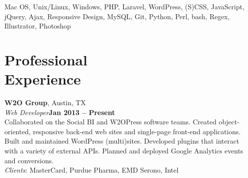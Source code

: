 \documentclass[margin,line]{resume}
\begin{document}
\begin{resume}

Mac OS, Unix/Linux, Windows, PHP, Laravel, WordPress, (S)CSS, JavaScript, jQuery, Ajax, Responsive Design, MySQL, Git, Python, Perl, bash, Regex, Illustrator, Photoshop






\section{\mysidestyle Professional\\Experience}

\textbf{W2O Group}, Austin, TX
\vspace{2mm}\\
\textsl{Web Developer}\hfill \textbf{Jan 2013 -- Present}\vspace{1mm}\\
Collaborated on the Social BI and W2OPress software teams. Created object-oriented, responsive back-end web sites and single-page front-end applications. Built and maintained WordPress (multi)sites. Developed plugins that interact with a variety of external APIs. Planned and deployed Google Analytics events and conversions.\vspace{1mm}\\
\textsl{Clients}: {\small MasterCard, Purdue Pharma, EMD Serono, Intel}



\end{resume}
\end{document}
